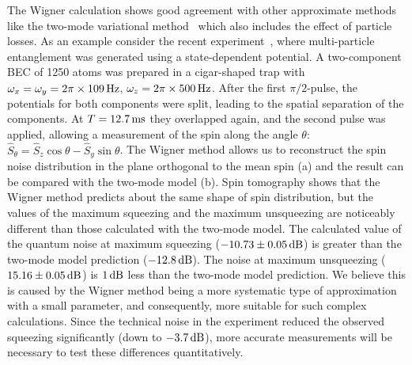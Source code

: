 The Wigner calculation shows good agreement with other approximate methods like the two-mode variational method~\cite{Li2009} which also includes the effect of particle losses.
As an example consider the recent experiment~\cite{Riedel2010},
where multi-particle entanglement was generated using a state-dependent potential.
A two-component BEC of 1250 atoms was prepared in a cigar-shaped trap with $\omega_x = \omega_y = 2 \pi \times 109\mbox{\ensuremath{\,\mathrm{Hz}}}$,
$\omega_z = 2 \pi \times 500\mbox{\ensuremath{\,\mathrm{Hz}}}$.
After the first $\pi / 2$-pulse, the potentials for both components were split, leading to the spatial separation of the components.
At $T = 12.7\mbox{\ensuremath{\,\mathrm{ms}}}$ they overlapped again, and the second pulse was applied, allowing a measurement of the spin along the angle $\theta$: $\hat{S}_\theta = \hat{S}_z \cos \theta - \hat{S}_y \sin \theta$.
The Wigner method allows us to reconstruct the spin noise distribution in the plane orthogonal to the mean spin (a) and the result can be compared with the two-mode model (b).
Spin tomography shows that the Wigner method predicts about the same shape of spin distribution,
but the values of the maximum squeezing and the maximum unsqueezing are noticeably different than those calculated with the two-mode model.
The calculated value of the quantum noise at maximum squeezing ($-10.73\pm0.05\mbox{\ensuremath{\,\mathrm{dB}}}$) is greater than the two-mode model prediction ($-12.8\mbox{\ensuremath{\,\mathrm{dB}}}$).
The noise at maximum unsqueezing ($15.16\pm0.05\mbox{\ensuremath{\,\mathrm{dB}}}$) is $1\mbox{\ensuremath{\,\mathrm{dB}}}$ less than the two-mode model prediction.
We believe this is caused by the Wigner method being a more systematic type of approximation with a small parameter,
and consequently, more suitable for such complex calculations.
Since the technical noise in the experiment reduced the observed squeezing significantly (down to $-3.7\mbox{\ensuremath{\,\mathrm{dB}}}$),
more accurate measurements will be necessary to test these differences quantitatively.

